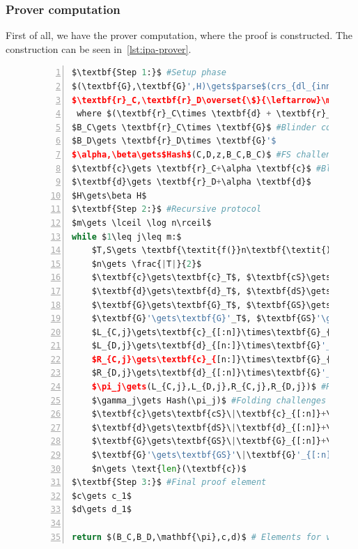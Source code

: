 \subsubsection*{Prover computation}
First of all, we have the prover computation, where the proof is constructed.
The construction can be seen in~\autoref{lst:ipa-prover}.

\begin{figure}[!htb]
    \begin{lstlisting}[language=Python,mathescape=true,label={lst:ipa-prover},numbers=left,caption={Prover computation for CAAU-IPA in CAAUrdleproofs},captionpos=b,frame=single]
$\textbf{Step 1:}$ #Setup phase
$(\textbf{G},\textbf{G}',H)\gets$parse$(crs_{dl_{inner}})$
$\textbf{r}_C,\textbf{r}_D\overset{\$}{\leftarrow}\mathbb{F}^n$ #Vector blinders
 where $(\textbf{r}_C\times \textbf{d} + \textbf{r}_D\times \textbf{c})=0\text{ and }\textbf{r}_C\times \textbf{r}_D=0$
$B_C\gets \textbf{r}_C\times \textbf{G}$ #Blinder commitments
$B_D\gets \textbf{r}_D\times \textbf{G}'$
$\alpha,\beta\gets$Hash$(C,D,z,B_C,B_C)$ #FS challenges
$\textbf{c}\gets \textbf{r}_C+\alpha \textbf{c}$ #Blinded vectors
$\textbf{d}\gets \textbf{r}_D+\alpha \textbf{d}$
$H\gets\beta H$
$\textbf{Step 2:}$ #Recursive protocol
$m\gets \lceil \log n\rceil$
while $1\leq j\leq m:$
    $T,S\gets \textbf{\textit{f(}}n\textbf{\textit{)}}$ #Scheme function
    $n\gets \frac{|T|}{2}$
    $\textbf{c}\gets\textbf{c}_T$, $\textbf{cS}\gets\textbf{c}_S$ #Vector splitting
    $\textbf{d}\gets\textbf{d}_T$, $\textbf{dS}\gets\textbf{d}_S$
    $\textbf{G}\gets\textbf{G}_T$, $\textbf{GS}\gets\textbf{G}_S$
    $\textbf{G}'\gets\textbf{G}'_T$, $\textbf{GS}'\gets\textbf{G}'_T$
    $L_{C,j}\gets\textbf{c}_{[:n]}\times\textbf{G}_{[n:]}+(\textbf{c}_{[:n]}\times\textbf{d}_{[n:]})H$ #Cross-comm
    $L_{D,j}\gets\textbf{d}_{[n:]}\times\textbf{G}'_{[:n]}$
    $R_{C,j}\gets\textbf{c}_{[n:]}\times\textbf{G}_{[:n]}+(\textbf{c}_{[n:]}\times\textbf{d}_{[:n]})H$
    $R_{D,j}\gets\textbf{d}_{[:n]}\times\textbf{G}'_{[n:]}$
    $\pi_j\gets(L_{C,j},L_{D,j},R_{C,j},R_{D,j})$ #Proof elements
    $\gamma_j\gets Hash(\pi_j)$ #Folding challenges
    $\textbf{c}\gets\textbf{cS}\|\textbf{c}_{[:n]}+\gamma_j^{-1}\textbf{c}_{[n:]}$ #Next round vectors
    $\textbf{d}\gets\textbf{dS}\|\textbf{d}_{[:n]}+\gamma_j\textbf{d}_{[n:]}$
    $\textbf{G}\gets\textbf{GS}\|\textbf{G}_{[:n]}+\gamma_j\textbf{G}_{[n:]}$
    $\textbf{G}'\gets\textbf{GS}'\|\textbf{G}'_{[:n]}+\gamma_j^{-1}\textbf{G}'_{[n:]}$
    $n\gets \text{len}(\textbf{c})$
$\textbf{Step 3:}$ #Final proof element
$c\gets c_1$
$d\gets d_1$

return $(B_C,B_D,\mathbf{\pi},c,d)$ # Elements for verifier
    \end{lstlisting}
\label{fig:ipa-prover}
\end{figure}
